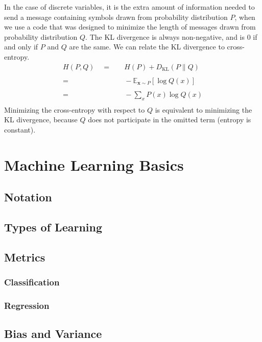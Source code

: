 \documentclass[twoside,twocolumn]{article}
\begin{document}
In the case of discrete variables, it is the extra amount of information
needed to send a message containing symbols drawn from probability distribution
$P$, when we use a code that was designed to minimize the length of messages
drawn from probability distribution $Q$. The KL divergence is always
non-negative, and is $0$ if and only if $P$ and $Q$ are the same. We can
relate the KL divergence to cross-entropy.
\begin{equation}
  \begin{split}
    H(P, Q) \quad =& \quad H(P) + D _ { \mathrm { KL } } ( P \| Q ) \\
    \\
    =& \quad - \mathbb { E } _ { \mathbf { x } \sim P } \left[ \log Q ( x ) \right]\\
    \\
    =& \quad -\sum_x P(x) \log Q(x) \\
  \end{split}
\end{equation}
Minimizing the cross-entropy with respect to $Q$ is equivalent to
minimizing the KL divergence, because $Q$ does not participate in the
omitted term (entropy is constant).
\section{Machine Learning Basics} %
\subsection{Notation}
\subsection{Types of Learning}
\subsection{Metrics}
\subsubsection{Classification}
\subsubsection{Regression}
\subsection{Bias and Variance}
\end{document}
